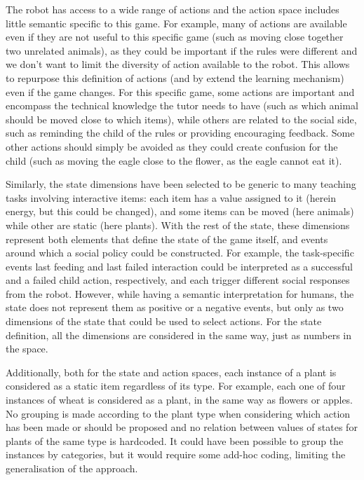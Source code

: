 The robot has access to a wide range of actions and the action space includes little semantic specific to this game. For example, many of actions are available even if they are not useful to this specific game (such as moving close together two unrelated animals), as they could be important if the rules were different and we don't want to limit the diversity of action available to the robot. This allows to repurpose this definition of actions (and by extend the learning mechanism) even if the game changes. For this specific game, some actions are important and encompass the technical knowledge the tutor needs to have (such as which animal should be moved close to which items), while others are related to the social side, such as reminding the child of the rules or providing encouraging feedback. Some other actions should simply be avoided as they could create confusion for the child (such as moving the eagle close to the flower, as the eagle cannot eat it). 

Similarly, the state dimensions have been selected to be generic to many teaching tasks involving interactive items: each item has a value assigned to it (herein energy, but this could be changed), and some items can be moved (here animals) while other are static (here plants). With the rest of the state, these dimensions represent both elements that define the state of the game itself, and events around which a social policy could be constructed. For example, the task-specific events last feeding and last failed interaction could be interpreted as a successful and a failed child action, respectively, and each trigger different social responses from the robot. However, while having a semantic interpretation for humans, the state does not represent them as positive or a negative events, but only as two dimensions of the state that could be used to select actions. For the state definition, all the dimensions are considered in the same way, just as numbers in the space. 

Additionally, both for the state and action spaces, each instance of a plant is considered as a static item regardless of its type. For example, each one of four instances of wheat is considered as a plant, in the same way as flowers or apples. No grouping is made according to the plant type when considering which action has been made or should be proposed and no relation between values of states for plants of the same type is hardcoded. It could have been possible to group the instances by categories, but it would require some add-hoc coding, limiting the generalisation of the approach. 

